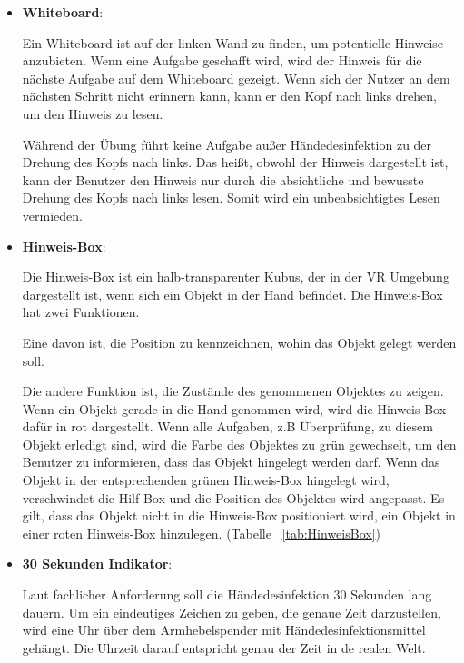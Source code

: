   \begin{itemize}
      \item \textbf{Whiteboard}:
      
      Ein Whiteboard ist auf der linken Wand zu finden, um potentielle Hinweise anzubieten. Wenn eine Aufgabe geschafft wird, wird der Hinweis für die nächste Aufgabe auf dem Whiteboard gezeigt. Wenn sich der Nutzer an dem nächsten Schritt nicht erinnern kann, kann er den Kopf nach links drehen, um den Hinweis zu lesen.
      
      Während der Übung führt keine Aufgabe außer Händedesinfektion zu der Drehung des Kopfs nach links. Das heißt, obwohl der Hinweis dargestellt ist, kann der Benutzer den Hinweis nur durch die absichtliche und bewusste Drehung des Kopfs nach links lesen. Somit wird ein unbeabsichtigtes Lesen vermieden.
      
      \item \textbf{Hinweis-Box}:
      
      Die Hinweis-Box ist ein halb-transparenter Kubus, der in der VR Umgebung dargestellt ist, wenn sich ein Objekt in der Hand befindet.  Die Hinweis-Box hat zwei Funktionen.
      
      Eine davon ist, die Position zu kennzeichnen, wohin das Objekt gelegt werden soll.
      
      Die andere Funktion ist, die Zustände des genommenen Objektes zu zeigen. Wenn ein Objekt gerade in die Hand genommen wird, wird die Hinweis-Box dafür in rot dargestellt. Wenn alle Aufgaben, z.B Überprüfung, zu diesem Objekt erledigt sind, wird die Farbe des Objektes zu grün gewechselt, um den Benutzer zu informieren, dass das Objekt hingelegt werden darf. Wenn das Objekt in der entsprechenden grünen Hinweis-Box hingelegt wird, verschwindet die Hilf-Box und die Position des Objektes wird angepasst. Es gilt, dass das Objekt nicht in die Hinweis-Box positioniert wird, ein Objekt in einer roten Hinweis-Box hinzulegen. (Tabelle ~\ref{tab:HinweisBox}) %
      
      \item \textbf{30 Sekunden Indikator}:
      
      Laut fachlicher Anforderung soll die Händedesinfektion 30 Sekunden lang dauern. Um ein eindeutiges Zeichen zu geben, die genaue Zeit darzustellen, wird eine Uhr über dem Armhebelspender mit Händedesinfektionsmittel gehängt. Die Uhrzeit darauf entspricht genau der Zeit in de realen Welt.
      

\end{itemize}
